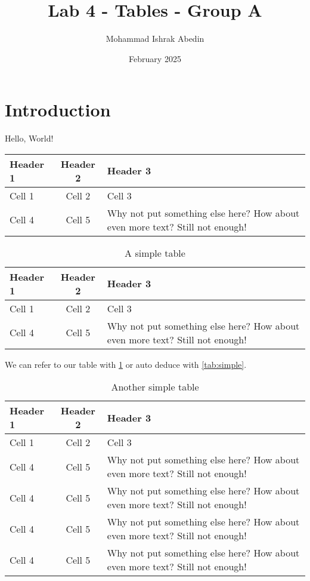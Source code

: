 \documentclass[12pt, a4paper]{article}
\title{Lab 4 - Tables - Group A}
\author{Mohammad Ishrak Abedin}
\date{February 2025}
\begin{document}
\maketitle

\section{Introduction}
\listoftables

Hello, World!

\begin{center}
    \begin{tabular}{| l || c | p{} |}
        \hline
        Header 1 & Header 2 & Header 3 \\
        \hline\hline
        Cell 1 & Cell 2 & Cell 3 \\
        \hline
        Cell 4 & Cell 5 & Why not put something else here? How about even more text? Still not enough! \\
        \hline
    \end{tabular}
\end{center}

\kant[1]

\begin{table}[htbp]
    \centering
    \begin{tabular}{| l || c | p{} |}
        \hline
        Header 1 & Header 2 & Header 3 \\[2em]
        \hline\hline
        Cell 1 & Cell 2 & Cell 3 \\
        \hline
        Cell 4 & Cell 5 & Why not put something else here? How about even more text? Still not enough! \\
        \hline
    \end{tabular}
    \caption{A simple table}
    \label{tab:simple}
\end{table}

We can refer to our table with \ref{tab:simple} or auto deduce with \autoref{tab:simple}. \kant[2]

\begin{table}[htbp]
    \centering
    \begin{tabular}{| l || c | C{0.3\textwidth} |}
        \hline
        Header 1 & Header 2 & Header 3 \\
        \hline\hline
        Cell 1 & Cell 2 & Cell 3 \\
        \hline
        Cell 4 & Cell 5 & Why not put something else here? How about even more text? Still not enough!\\
        \hline
        Cell 4 & Cell 5 & Why not put something else here? How about even more text? Still not enough! \\
        \hline
        Cell 4 & Cell 5 & Why not put something else here? How about even more text? Still not enough! \\
        \hline
        Cell 4 & Cell 5 & Why not put something else here? How about even more text? Still not enough! \\
        \hline
    \end{tabular}
    \caption{Another simple table}
    \label{tab:simple2}
\end{table}
\end{document}
